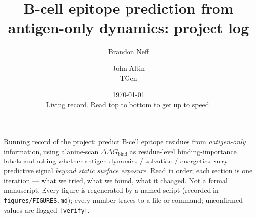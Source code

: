 \documentclass[11pt]{article}
\title{B-cell epitope prediction from antigen-only dynamics: project log}
\author{Brandon Neff \and John Altin \\ \small TGen}
\date{\today\\[2pt]\small Living record. Read top to bottom to get up to speed.}
\begin{document}
\maketitle

\noindent
Running record of the project: predict B-cell epitope residues from \emph{antigen-only}
information, using alanine-scan $\Delta\Delta G_\mathrm{bind}$ as residue-level binding-importance
labels and asking whether antigen dynamics / solvation / energetics carry predictive signal
\emph{beyond static surface exposure}. Read in order; each section is one iteration --- what we
tried, what we found, what it changed. Not a formal manuscript. Every figure is regenerated by a
named script (recorded in \texttt{figures/FIGURES.md}); every number traces to a file or command;
unconfirmed values are flagged \texttt{[verify]}.
















\end{document}

